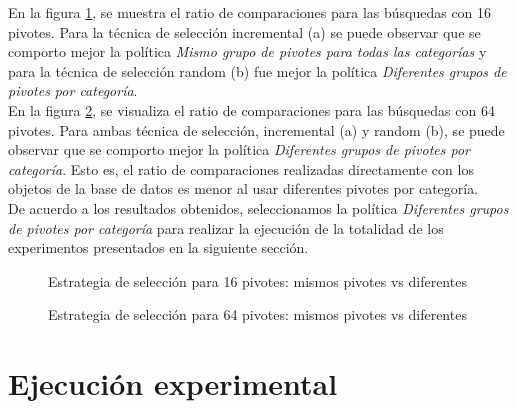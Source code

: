En la figura \ref{fig:same-vs-diff-16Pivotes}, se muestra el ratio de comparaciones para las b\'usquedas con 16 pivotes. Para la t\'ecnica de selecci\'on incremental (a) se puede observar que se comporto mejor la pol\'itica \textit{Mismo grupo de pivotes para todas las categor\'ias} y para la t\'ecnica de selecci\'on random (b) fue mejor la pol\'itica \textit{Diferentes grupos de pivotes por categor\'ia}.\\

En la figura \ref{fig:same-vs-diff-64Pivotes}, se visualiza el ratio de comparaciones para las b\'usquedas con 64 pivotes. Para ambas t\'ecnica de selecci\'on, incremental (a) y random (b), se puede observar que se comporto mejor la pol\'itica \textit{Diferentes grupos de pivotes por categor\'ia}. Esto es, el ratio de comparaciones realizadas directamente con los objetos de la base de datos es menor al usar diferentes pivotes por categor\'ia.\\

De acuerdo a los resultados obtenidos, seleccionamos la pol\'itica \textit{Diferentes grupos de pivotes por categor\'ia} para realizar la ejecuci\'on de la totalidad de los experimentos presentados en la siguiente secci\'on.\\

\begin{figure}[tb]
\centering
{}
		\caption{\small Estrategia de selecci\'on para 16 pivotes: mismos pivotes vs diferentes}
		\label{fig:same-vs-diff-16Pivotes}
\end{figure}

\begin{figure}[tb]
\centering
{}
		\caption{\small Estrategia de selecci\'on para 64 pivotes: mismos pivotes vs diferentes}
		\label{fig:same-vs-diff-64Pivotes}
\end{figure}

\section{Ejecuci\'on experimental}

